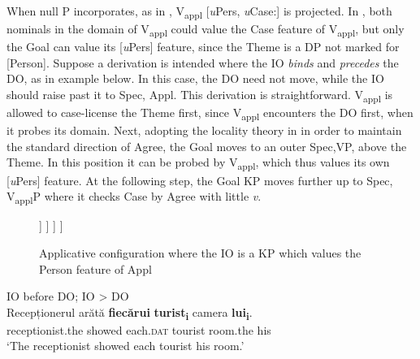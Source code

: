 \documentclass[output=paper,colorlinks,citecolor=brown,nonflat]{langsci/langscibook}
\begin{document}
When null P incorporates, as in , V\textsubscript{appl} [\textit{u}Pers, \textit{u}Case:{\longrule}] is projected. In , both nominals in the domain of V\textsubscript{appl} could value the Case feature of V\textsubscript{appl}, but only the Goal can value its [\textit{u}Pers{\longrule}] feature, since the Theme is a DP not marked for [Person]. Suppose a derivation is intended where the IO \textit{binds} and \textit{precedes} the DO, as in example  below. In this case, the DO need not move, while the IO should raise past it to Spec, Appl. This derivation is straightforward. V\textsubscript{appl} is allowed to case-license the Theme first, since V\textsubscript{appl} encounters the DO first, when it probes its domain. Next, adopting the locality theory in \citet{Dogget2004} in order to maintain the standard direction of Agree, the Goal moves to an outer Spec,VP, above the Theme. In this position it can be probed by V\textsubscript{appl}, which thus values its own [\textit{u}Pers] feature. At the following step, the Goal KP moves further up to Spec, V\textsubscript{appl}P where it checks Case by Agree with little \textit{v}.


\begin{figure}%
	\begin{forest}
		[\textit{v}P
			[\textit{v}
			]
			[V\textsubscript{Appl}P
				[{V\textsubscript{Appl}\\
					{[}\textit{u}Pers:\_\_{, u}Case:\_\_{]}}
				]
				[VP
					[DP\textsubscript{Theme}\\{[}Case: \textsc{acc}{]}
					]
					[V'
						[{V\\P+V}
						]
						[{KP\textsubscript{Goal}\\{[}\textit{u}Case: \textsc{dat}, \textbf{iPers}{]}}
						]
					]
				]
			]
		]
	\end{forest}
	\caption{\label{fig:cornilescu:8} Applicative configuration where the IO is a KP which values the Person feature of Appl}
\end{figure}

\ea%
      \label{ex:cornilescu:25}
      IO before DO; IO > DO \\
      \gll Recepționerul arătă \textbf{fiecărui} \textbf{turist\textsubscript{i}} camera \textbf{lui\textsubscript{i}}.\\
           receptionist.the showed each.\textsc{dat} tourist room.the his\\
      \glt ‘The receptionist showed each tourist his room.’ \citep{CornilescuDinuTigău2017DOC}
      \z
\end{document}
